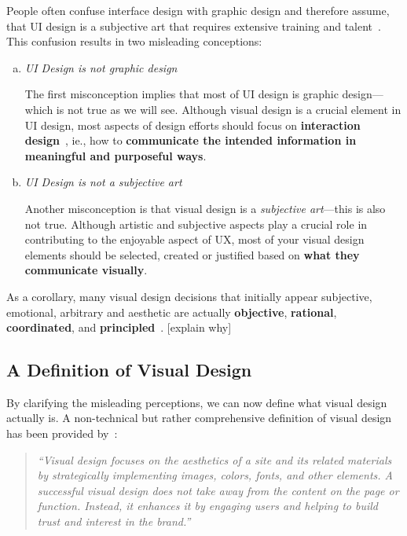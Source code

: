 People often confuse interface design with graphic design and therefore assume, that UI design is a subjective art that requires extensive training and talent~\citep{mckay:2013}.
This confusion results in two misleading conceptions:

\begin{enumerate}[a)]
	\item \emph{UI Design is not graphic design} \par The first misconception implies that most of UI design is graphic design---which is not true as we will see. Although visual design is a crucial element in UI design, most aspects of design efforts should focus on \textbf{interaction design}~\citep{mckay:2013}, ie., how to \textbf{communicate the intended information in meaningful and purposeful ways}.

	\item \emph{UI Design is not a subjective art} \par Another misconception is that visual design is a \emph{subjective art}---this is also not true. 
Although artistic and subjective aspects play a crucial role in contributing to the enjoyable aspect of UX, most of your visual design elements should be selected, created or justified based on \textbf{what they communicate visually}.
\end{enumerate}


As a corollary, many visual design decisions that initially appear subjective, emotional, arbitrary and aesthetic are actually \textbf{objective}, \textbf{rational}, \textbf{coordinated}, and \textbf{principled}~\citep{mckay:2013}. [explain why]

\subsection{A Definition of Visual Design} %
\label{sub:a_definition_of_visual_design}

By clarifying the misleading perceptions, we can now define what visual design actually is.
A non-technical but rather comprehensive definition of visual design has been provided by~\citep{usability_gov:2018a}:

\begin{quote}
\emph{``Visual design focuses on the aesthetics of a site and its related materials by strategically implementing images, colors, fonts, and other elements. A successful visual design does not take away from the content on the page or function.  Instead, it enhances it by engaging users and helping to build trust and interest in the brand.''}~\citep{usability_gov:2018a}
\end{quote}

